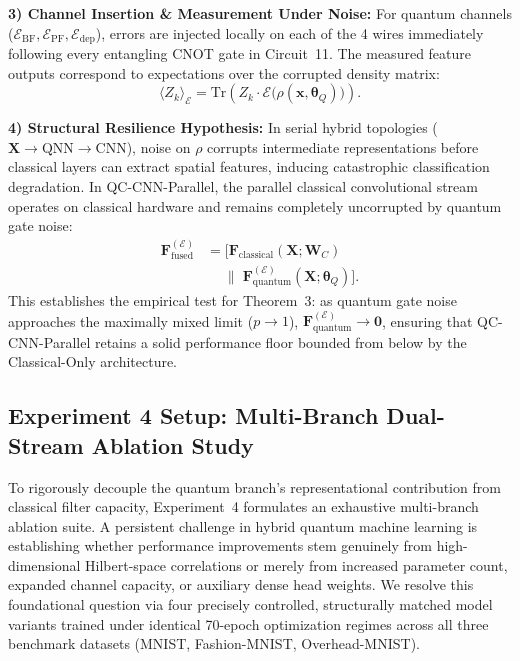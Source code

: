 \documentclass[pdflatex,sn-mathphys-num]{sn-jnl}%
\theoremstyle{thmstyleone}%
\theoremstyle{thmstyletwo}%
\theoremstyle{thmstylethree}%
\begin{document}
\textbf{3) Channel Insertion \& Measurement Under Noise:}
For quantum channels ($\mathcal{E}_{\mathrm{BF}}, \mathcal{E}_{\mathrm{PF}}, \mathcal{E}_{\mathrm{dep}}$), errors are injected locally on each of the 4 wires immediately following every entangling CNOT gate in Circuit~11. The measured feature outputs correspond to expectations over the corrupted density matrix:
\begin{equation}
\langle Z_k \rangle_{\mathcal{E}} = \mathrm{Tr}\left( Z_k \cdot \mathcal{E}\big( \rho(\mathbf{x}, \boldsymbol{\theta}_Q) \big) \right).
\label{eq:noisy_expectation}
\end{equation}

\textbf{4) Structural Resilience Hypothesis:}
In serial hybrid topologies ($\mathbf{X} \to \text{QNN} \to \text{CNN}$), noise on $\rho$ corrupts intermediate representations before classical layers can extract spatial features, inducing catastrophic classification degradation. In QC-CNN-Parallel, the parallel classical convolutional stream operates on classical hardware and remains completely uncorrupted by quantum gate noise:
\begin{align}
\mathbf{F}_{\mathrm{fused}}^{(\mathcal{E})} &= \Big[ \mathbf{F}_{\mathrm{classical}}(\mathbf{X}; \mathbf{W}_C) \nonumber \\
&\quad\; \|\; \mathbf{F}_{\mathrm{quantum}}^{(\mathcal{E})}(\mathbf{X}; \boldsymbol{\theta}_Q) \Big].
\label{eq:fused_noisy_stream}
\end{align}
This establishes the empirical test for Theorem~3: as quantum gate noise approaches the maximally mixed limit ($p \to 1$), $\mathbf{F}_{\mathrm{quantum}}^{(\mathcal{E})} \to \mathbf{0}$, ensuring that QC-CNN-Parallel retains a solid performance floor bounded from below by the Classical-Only architecture.

\subsection{Experiment 4 Setup: Multi-Branch Dual-Stream Ablation Study}
\label{subsec:exp4_setup}
To rigorously decouple the quantum branch's representational contribution from classical filter capacity, Experiment~4 formulates an exhaustive multi-branch ablation suite. A persistent challenge in hybrid quantum machine learning is establishing whether performance improvements stem genuinely from high-dimensional Hilbert-space correlations or merely from increased parameter count, expanded channel capacity, or auxiliary dense head weights. We resolve this foundational question via four precisely controlled, structurally matched model variants trained under identical 70-epoch optimization regimes across all three benchmark datasets (MNIST, Fashion-MNIST, Overhead-MNIST).
\end{document}
